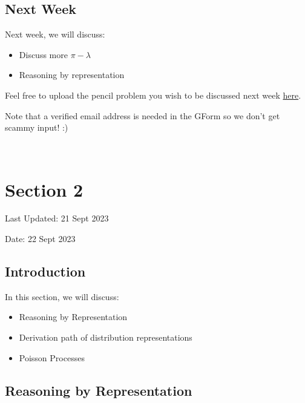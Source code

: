 \documentclass[
  letterpaper,
  DIV=11,
  numbers=noendperiod]{scrreprt}
\providecommand{\tightlist}{%
  \setlength{\itemsep}{0pt}\setlength{\parskip}{0pt}}\usepackage{longtable,booktabs,array}
\theoremstyle{definition}
\theoremstyle{plain}
\theoremstyle{remark}
\begin{document}
\hypertarget{next-week}{%
\section*{Next Week}\label{next-week}}


Next week, we will discuss:

\begin{itemize}
\tightlist
\item
  Discuss more \(\pi-\lambda\)
\item
  Reasoning by representation
\end{itemize}

Feel free to upload the pencil problem you wish to be discussed next
week \href{https://forms.gle/RBmMNYJp4u3qD5W79}{here}.

Note that a verified email address is needed in the GForm so we don't
get scammy input! :)

\(\,\)


\hypertarget{section-2}{%
\chapter*{Section 2}\label{section-2}}


Last Updated: 21 Sept 2023

Date: 22 Sept 2023

\hypertarget{introduction-1}{%
\section*{Introduction}\label{introduction-1}}


In this section, we will discuss:

\begin{itemize}
\tightlist
\item
  Reasoning by Representation
\item
  Derivation path of distribution representations
\item
  Poisson Processes
\end{itemize}

\hypertarget{reasoning-by-representation}{%
\section*{Reasoning by
Representation}\label{reasoning-by-representation}}
\end{document}
